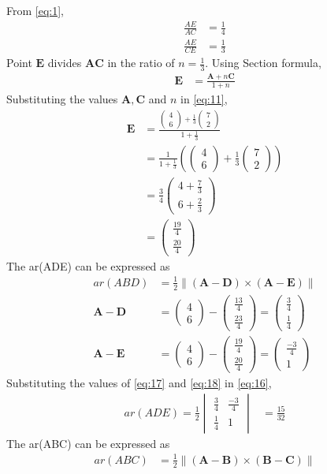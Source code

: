 \documentclass[12pt]{article}
\newcommand{\mydet}[1]{\ensuremath{\begin{vmatrix}#1\end{vmatrix}}}
\providecommand{\brak}[1]{\ensuremath{\left(#1\right)}}
\providecommand{\norm}[1]{\left\lVert#1\right\rVert}
\newcommand{\myvec}[1]{\ensuremath{\begin{pmatrix}#1\end{pmatrix}}}
\let\vec\mathbf
\begin{document}
\begin{enumerate}
From \eqref{eq:1},
\begin{align}
\frac{AE}{AC} &=\frac{1}{4}\\
\frac{AE}{CE} &=\frac{1}{3}
\end{align}
Point $\vec{E}$ divides $\vec{A}\vec{C}$ in the ratio of $n = \frac{1}{3}$.
Using Section formula,
\begin{align}
\vec{E} &=\frac{\vec{A}+n\vec{C}}{1+n}\label{eq:11}
\end{align}
Substituting the values $\vec{A},\vec{C}$ and $n$ in \eqref{eq:11},
\begin{align}
\vec{E} &=\frac{{\myvec{4\\6}+\frac{1}{3}\myvec{7\\2}}}{1+\frac{1}{3}}\\
	&=\frac{1}{1+\frac{1}{3}}\brak{{\myvec{4\\6}+\frac{1}{3}\myvec{7\\2}}} \\
	&=\frac{3}{4}\myvec{4+\frac{7}{3}\\[2pt]6+\frac{2}{3}}\\
	&=\myvec{\frac{19}{4}\\[2pt] \frac{20}{4}}
\end{align}
The ar(ADE) can be expressed as
\begin{align}
	ar(ABD) &=\frac{1}{2} \norm{\brak{\vec{A}-\vec{D}}  \times 
   \brak{\vec{A}- \vec{E}}} \label{eq:16} \\
	\vec{A}- \vec{D} &= \myvec{4\\6}-\myvec{\frac{13}{4}\\[2pt] \frac{23}{4}}=\myvec{\frac{3}{4}\\[2pt] \frac{1}{4}}\label{eq:17}\\
	  \vec{A}- \vec{E} &= \myvec{4\\6}-\myvec{\frac{19}{4}\\[2pt] \frac{20}{4}}=\myvec{\frac{-3}{4}\\[2pt]1}\label{eq:18}
  \end{align}
Substituting the values of \eqref{eq:17} and \eqref{eq:18} in \eqref{eq:16},
\begin{align}
	ar(ADE)=\frac{1}{2}\mydet{\frac{3}{4} & \frac{-3}{4}\\[2pt] \frac{1}{4} & 1}  
	&=	\frac{15}{32}
\end{align}
The ar(ABC) can be expressed as
  \begin{align}
	  ar(ABC) &=\frac{1}{2} \norm{\brak{\vec{A}-\vec{B}}  \times 
   \brak{\vec{B}- \vec{C}}} \label{eq:20} \\

\end{align}
\end{enumerate}
\end{document}
